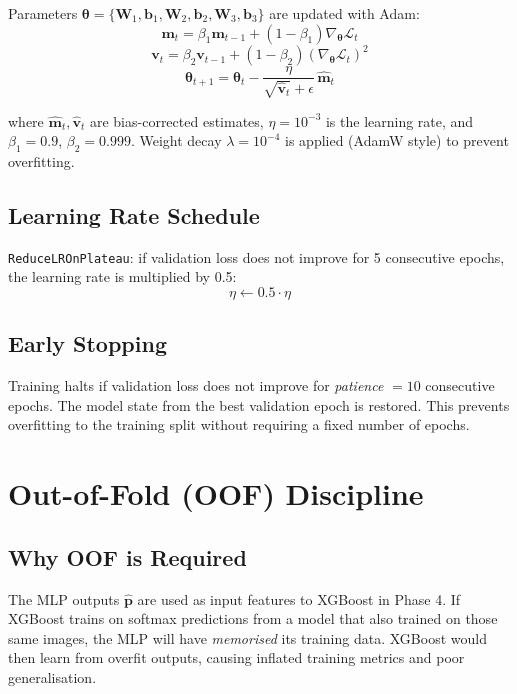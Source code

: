 \documentclass[12pt]{article}
\begin{document}
Parameters $\bm{\theta} = \{\bm{W}_1, \bm{b}_1, \bm{W}_2, \bm{b}_2, \bm{W}_3, \bm{b}_3\}$
are updated with Adam:
\[
\bm{m}_t = \beta_1 \bm{m}_{t-1} + (1-\beta_1)\nabla_{\bm{\theta}}\mathcal{L}_t
\]
\[
\bm{v}_t = \beta_2 \bm{v}_{t-1} + (1-\beta_2)(\nabla_{\bm{\theta}}\mathcal{L}_t)^2
\]
\[
\bm{\theta}_{t+1} = \bm{\theta}_t
  - \frac{\eta}{\sqrt{\hat{\bm{v}}_t} + \epsilon}\,\hat{\bm{m}}_t
\]

where $\hat{\bm{m}}_t, \hat{\bm{v}}_t$ are bias-corrected estimates,
$\eta = 10^{-3}$ is the learning rate, and $\beta_1 = 0.9$, $\beta_2 = 0.999$.
Weight decay $\lambda = 10^{-4}$ is applied (AdamW style) to prevent
overfitting.

\subsection{Learning Rate Schedule}

\texttt{ReduceLROnPlateau}: if validation loss does not improve for 5 consecutive
epochs, the learning rate is multiplied by 0.5:
\[
\eta \leftarrow 0.5 \cdot \eta
\]

\subsection{Early Stopping}

Training halts if validation loss does not improve for \textit{patience} $= 10$
consecutive epochs. The model state from the best validation epoch is restored.
This prevents overfitting to the training split without requiring a fixed number
of epochs.

\section{Out-of-Fold (OOF) Discipline}

\subsection{Why OOF is Required}

The MLP outputs $\hat{\bm{p}}$ are used as input features to XGBoost in
Phase 4. If XGBoost trains on softmax predictions from a model that also
trained on those same images, the MLP will have \textit{memorised} its
training data. XGBoost would then learn from overfit outputs, causing
inflated training metrics and poor generalisation.
\end{document}
